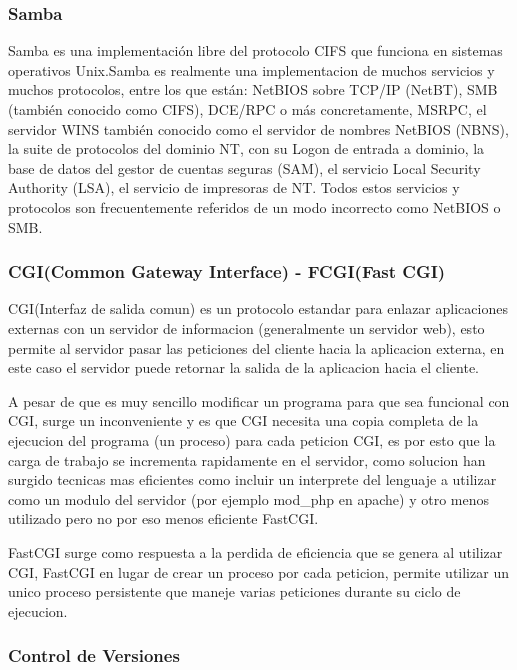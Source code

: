 \subsubsection*{Samba \cite{samba} }

Samba es una implementación libre del protocolo CIFS que funciona en sistemas operativos Unix.\newline Samba es realmente una implementacion de muchos servicios y muchos protocolos, entre los que están: NetBIOS sobre TCP/IP (NetBT), SMB (también conocido como CIFS), DCE/RPC o más concretamente, MSRPC, el servidor WINS también conocido como el servidor de nombres NetBIOS (NBNS), la suite de protocolos del dominio NT, con su Logon de entrada a dominio, la base de datos del gestor de cuentas seguras (SAM), el servicio Local Security Authority (LSA), el servicio de impresoras de NT. Todos estos servicios y protocolos son frecuentemente referidos de un modo incorrecto como NetBIOS o SMB.


\subsubsection*{CGI(Common Gateway Interface) - FCGI(Fast CGI)}

CGI(Interfaz de salida comun) es un protocolo estandar para enlazar aplicaciones externas con un servidor de informacion (generalmente un servidor web), esto permite al servidor pasar las peticiones del cliente hacia la aplicacion externa, en este caso el servidor puede retornar la salida de la aplicacion hacia el cliente.

A pesar de que es muy sencillo modificar un programa para que sea funcional con CGI, surge un inconveniente y es que CGI necesita una copia completa de la ejecucion del programa (un proceso) para cada peticion CGI, es por esto que la carga de trabajo se incrementa rapidamente en el servidor, como solucion han surgido tecnicas mas eficientes como incluir un interprete del lenguaje a utilizar como un modulo del servidor (por ejemplo mod\_php en apache) y otro menos utilizado pero no por eso menos eficiente FastCGI.

FastCGI surge como respuesta a la perdida de eficiencia que se genera al utilizar CGI, FastCGI en lugar de crear un proceso por cada peticion, permite utilizar un unico proceso persistente que maneje varias peticiones durante su ciclo de ejecucion.


\subsubsection*{Control de Versiones}

